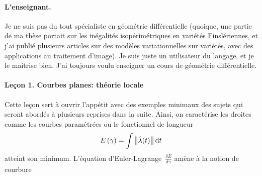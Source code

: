 \paragraph{L'enseignant.}
Je ne suis pas du tout spécialiste en géométrie différentielle (quoique, une
partie de ma thèse portait sur les inégalités isopérimétriques en variétés
Finslériennes, et j'ai publié plusieurs articles sur des modèles
variationnelles sur variétés, avec des applications au traitement d'image).
Je suis juste un utilisateur du langage, et je le maitrise bien.
J'ai toujours voulu enseigner un cours de géométrie différentielle.

\paragraph{Leçon 1.  Courbes planes: théorie locale}
Cette leçon sert à ouvrir l'appétit avec des exemples minimaux des sujets qui
seront abordés à plusieurs reprises dans la suite.  Ainsi, on caractérise les
droites comme les courbes paramétrées ou le fonctionnel de longueur
$$E\left(\gamma\right)=\int \left\|\dot\lambda(t)\right\|\mathrm{d} t$$
atteint son minimum.  L'équation d'Euler-Lagrange~$\frac{\delta
E}{\delta\gamma}$ amène à la notion de courbure



